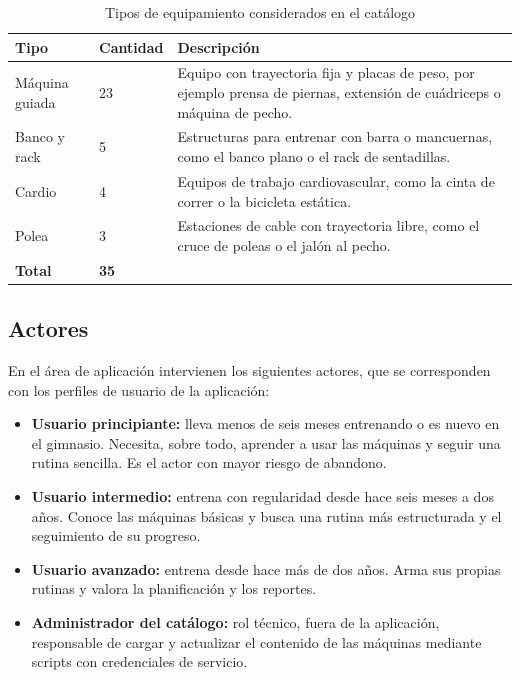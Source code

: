 \begin{table}[H]
\centering
\caption{Tipos de equipamiento considerados en el catálogo}
\label{tab:tipos-equipamiento}
\begin{tabularx}{\textwidth}{|L{3cm}|C{2.0cm}|Y|}
\hline
{} \textbf{Tipo} & \textbf{Cantidad} & \textbf{Descripción} \\
\hline
Máquina guiada & 23 & Equipo con trayectoria fija y placas de peso, por
ejemplo prensa de piernas, extensión de cuádriceps o máquina de pecho. \\ \hline
Banco y rack & 5 & Estructuras para entrenar con barra o mancuernas, como el
banco plano o el rack de sentadillas. \\ \hline
Cardio & 4 & Equipos de trabajo cardiovascular, como la cinta de correr o la
bicicleta estática. \\ \hline
Polea & 3 & Estaciones de cable con trayectoria libre, como el cruce de poleas
o el jalón al pecho. \\
\hline
\textbf{Total} & \textbf{35} & \\
\hline
\end{tabularx}
\end{table}

\subsection{Actores}

En el área de aplicación intervienen los siguientes actores, que se
corresponden con los perfiles de usuario de la aplicación:

\begin{itemize}
    \item \textbf{Usuario principiante:} lleva menos de seis meses entrenando
    o es nuevo en el gimnasio. Necesita, sobre todo, aprender a usar las
    máquinas y seguir una rutina sencilla. Es el actor con mayor riesgo de
    abandono.
    \item \textbf{Usuario intermedio:} entrena con regularidad desde hace seis
    meses a dos años. Conoce las máquinas básicas y busca una rutina más
    estructurada y el seguimiento de su progreso.
    \item \textbf{Usuario avanzado:} entrena desde hace más de dos años. Arma
    sus propias rutinas y valora la planificación y los reportes.
    \item \textbf{Administrador del catálogo:} rol técnico, fuera de la
    aplicación, responsable de cargar y actualizar el contenido de las
    máquinas mediante scripts con credenciales de servicio.
\end{itemize}

